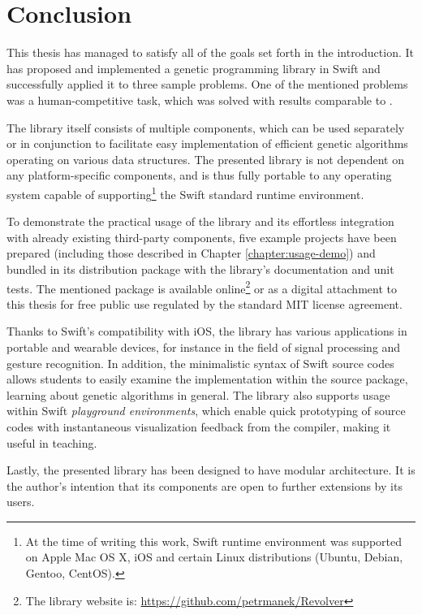 \chapter{Conclusion}

This thesis has managed to satisfy all of the goals set forth in the introduction. It has proposed and implemented a genetic programming library in Swift and successfully applied it to three sample problems. One of the mentioned problems was a human-competitive task, which was solved with results comparable to \cite{EvolvingQwopGaits}.

The library itself consists of multiple components, which can be used separately or in conjunction to facilitate easy implementation of efficient genetic algorithms operating on various data structures. The presented library is not dependent on any platform-specific components, and is thus fully portable to any operating system capable of supporting\footnote{At the time of writing this work, Swift runtime environment was supported on Apple Mac OS X, iOS and certain Linux distributions (Ubuntu, Debian, Gentoo, CentOS).} the Swift standard runtime environment. 

To demonstrate the practical usage of the library and its effortless integration with already existing third-party components, five example projects have been prepared (including those described in Chapter \ref{chapter:usage-demo}) and bundled in its distribution package with the library's documentation and unit tests. The mentioned package is available online\footnote{The library website is: \url{https://github.com/petrmanek/Revolver}} or as a digital attachment to this thesis for free public use regulated by the standard MIT license agreement.

Thanks to Swift's compatibility with iOS, the library has various applications in portable and wearable devices, for instance in the field of signal processing and gesture recognition. In addition, the minimalistic syntax of Swift source codes allows students to easily examine the implementation within the source package, learning about genetic algorithms in general. The library also supports usage within Swift \textit{playground environments}, which enable quick prototyping of source codes with instantaneous visualization feedback from the compiler, making it useful in teaching.

Lastly, the presented library has been designed to have modular architecture. It is the author's intention that its components are open to further extensions by its users.

